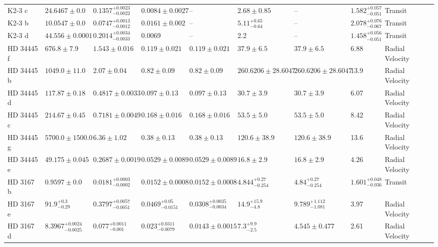 \begin{tabular}{llllllllll}
K2-3 c & $24.6467 \pm 0.0$ & $0.1357^{+0.0023}_{-0.0022}$ & $0.0084 \pm 0.0027$ & -- & $2.68 \pm 0.85$ & -- & $1.582^{+0.057}_{-0.051}$ & Transit & \cite{DIAMOND_LOWE_ET_AL__2022} \\
K2-3 b & $10.0547 \pm 0.0$ & $0.0747^{+0.0013}_{-0.0012}$ & $0.0161 \pm 0.002$ & -- & $5.11^{+0.65}_{-0.64}$ & -- & $2.078^{+0.076}_{-0.067}$ & Transit & \cite{DIAMOND_LOWE_ET_AL__2022} \\
K2-3 d & $44.556 \pm 0.0001$ & $0.2014^{+0.0034}_{-0.0033}$ & 0.0069 & -- & 2.2 & -- & $1.458^{+0.056}_{-0.051}$ & Transit & \cite{DIAMOND_LOWE_ET_AL__2022} \\
HD 34445 f & $676.8 \pm 7.9$ & $1.543 \pm 0.016$ & $0.119 \pm 0.021$ & $0.119 \pm 0.021$ & $37.9 \pm 6.5$ & $37.9 \pm 6.5$ & 6.88 & Radial Velocity & \cite{VOGT_ET_AL__2017} \\
HD 34445 b & $1049.0 \pm 11.0$ & $2.07 \pm 0.04$ & $0.82 \pm 0.09$ & $0.82 \pm 0.09$ & $260.6206 \pm 28.6047$ & $260.6206 \pm 28.6047$ & 13.9 & Radial Velocity & \cite{STASSUN_ET_AL__2017} \\
HD 34445 d & $117.87 \pm 0.18$ & $0.4817 \pm 0.0033$ & $0.097 \pm 0.13$ & $0.097 \pm 0.13$ & $30.7 \pm 3.9$ & $30.7 \pm 3.9$ & 6.07 & Radial Velocity & \cite{VOGT_ET_AL__2017} \\
HD 34445 c & $214.67 \pm 0.45$ & $0.7181 \pm 0.0049$ & $0.168 \pm 0.016$ & $0.168 \pm 0.016$ & $53.5 \pm 5.0$ & $53.5 \pm 5.0$ & 8.42 & Radial Velocity & \cite{VOGT_ET_AL__2017} \\
HD 34445 g & $5700.0 \pm 1500.0$ & $6.36 \pm 1.02$ & $0.38 \pm 0.13$ & $0.38 \pm 0.13$ & $120.6 \pm 38.9$ & $120.6 \pm 38.9$ & 13.6 & Radial Velocity & \cite{VOGT_ET_AL__2017} \\
HD 34445 e & $49.175 \pm 0.045$ & $0.2687 \pm 0.0019$ & $0.0529 \pm 0.0089$ & $0.0529 \pm 0.0089$ & $16.8 \pm 2.9$ & $16.8 \pm 2.9$ & 4.26 & Radial Velocity & \cite{VOGT_ET_AL__2017} \\
HD 3167 b & $0.9597 \pm 0.0$ & $0.0181^{+0.0003}_{-0.0002}$ & $0.0152 \pm 0.0008$ & $0.0152 \pm 0.0008$ & $4.844^{+0.27}_{-0.254}$ & $4.84^{+0.27}_{-0.254}$ & $1.601^{+0.048}_{-0.036}$ & Transit & \cite{COY_ET_AL_2026} \\
HD 3167 e & $91.9^{+0.3}_{-0.29}$ & $0.3797^{+0.0057}_{-0.0051}$ & $0.0469^{+0.05}_{-0.0151}$ & $0.0308^{+0.0035}_{-0.0034}$ & $14.9^{+15.9}_{-4.8}$ & $9.789^{+1.112}_{-1.081}$ & 3.97 & Radial Velocity & \cite{COY_ET_AL_2026} \\
HD 3167 d & $8.3967^{+0.0024}_{-0.0025}$ & $0.077^{+0.0011}_{-0.001}$ & $0.023^{+0.0311}_{-0.0079}$ & $0.0143 \pm 0.0015$ & $7.3^{+9.9}_{-2.5}$ & $4.545 \pm 0.477$ & 2.61 & Radial Velocity & \cite{COY_ET_AL_2026} \\

\end{tabular}
